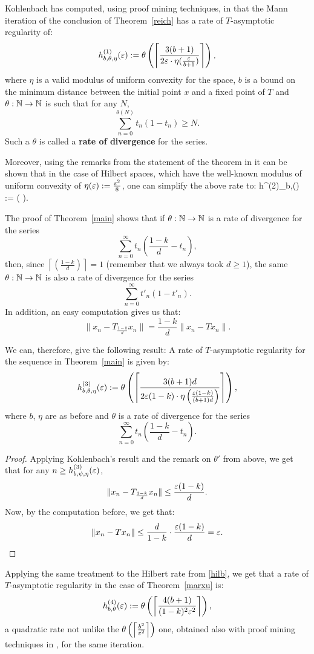 \documentclass{article}
\begin{document}
Kohlenbach has computed, using proof mining techniques, in \cite[Theorem 3.4]{Koh03} that the Mann iteration of the conclusion of Theorem~\ref{reich} has a rate of $T$-asymptotic regularity of:
$$h^{(1)}_{b,\theta,\eta}(\varepsilon) := \theta \left( \left\lceil \frac{3(b+1)}{2\varepsilon \cdot \eta(\frac{\varepsilon}{b+1})} \right\rceil \right),$$
where $\eta$ is a valid modulus of uniform convexity for the space, $b$ is a bound on the minimum distance between the initial point $x$ and a fixed point of $T$ and $\theta: {\mathbb N} \to {\mathbb N}$ is such that for any $N$,
$$\sum_{n=0}^{\theta(N)} t_n (1-t_n) \geq N.$$
Such a $\theta$ is called a {\bf rate of divergence} for the series.

Moreover, using the remarks from the statement of the theorem in \cite{Koh03} it can be shown that in the case of Hilbert spaces, which have the well-known modulus of uniform convexity of $\eta(\varepsilon):=\frac{\varepsilon^2}{8}$, one can simplify the above rate to:
\beq
h^{(2)}_{b,\theta}(\eps) := \theta \left( \left\lceil {} \right\rceil \right). \label{hilb}
\eeq

The proof of Theorem~\ref{main} shows that if $\theta: {\mathbb N} \to {\mathbb N}$ is a rate of divergence for the series
$$\sum_{n=0}^\infty t_n\left(\frac{1-k}{d}-t_n\right),$$
then, since $\left \lceil \left( \frac{1-k}{d} \right) \right \rceil = 1$ (remember that we always took $d \geq 1$), the same $\theta: {\mathbb N} \to {\mathbb N}$ is also a rate of divergence for the series
$$\sum_{n=0}^\infty t'_n (1-t'_n).$$
In addition, an easy computation gives us that:
$$\|x_n - T_{\frac{1-k}{d}}x_n\|=\frac{1-k}{d}\|x_n-Tx_n\|.$$

We can, therefore, give the following result:
\bthm
A rate of $T$-asymptotic regularity for the sequence in Theorem~\ref{main} is given by:
$$h^{(3)}_{b,\theta,\eta}(\varepsilon):=\theta\left(\left\lceil \frac{3(b+1)d}{2\varepsilon(1-k) \cdot \eta\left(\frac{\varepsilon(1-k)}{(b+1)d}\right)} \right\rceil \right),$$
where $b$, $\eta$ are as before and $\theta$ is a rate of divergence for the series
$$\sum_{n=0}^\infty t_n\left(\frac{1-k}{d}-t_n\right).$$
\ethm

\begin{proof}
Applying Kohlenbach's result and the remark on $\theta'$ from above, we get that for any $n \geq h^{(3)}_{b,\psi,\eta}(\varepsilon)$,
$$\|x_n - T_{\frac{1-k}{d}}x_n\| \leq \frac{\varepsilon(1-k)}{d}.$$
Now, by the computation before, we get that:
$$\|x_n-Tx_n\| \leq \frac{d}{1-k} \cdot \frac{\varepsilon(1-k)}{d} = \varepsilon.$$
\end{proof}

Applying the same treatment to the Hilbert rate from \eqref{hilb}, we get that a rate of $T$-asymptotic regularity in the case of Theorem~\ref{marxu} is:
$$h^{(4)}_{b,\theta}(\varepsilon) := \theta \left(  \left\lceil \frac{4(b+1)}{(1-k)^2\varepsilon^2 } \right\rceil \right),$$
a quadratic rate not unlike the $\theta \left( \left\lceil \frac{b^2}{\varepsilon^2 } \right\rceil \right)$ one, obtained also with proof mining techniques in \cite{IvaLeu15}, for the same iteration.
\end{document}
